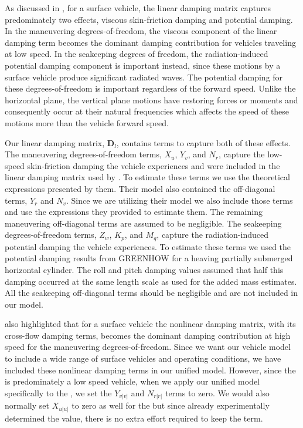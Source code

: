 \documentclass[utf8]{frontiersSCNS} %
\begin{document}
\color{red} As discussed in \citet{fossen11handbook}, for a surface vehicle, the linear damping matrix captures predominately two effects, viscous skin-friction damping and potential damping. In the maneuvering degrees-of-freedom, the viscous component of the linear damping term becomes the dominant damping contribution for vehicles traveling at low speed. In the seakeeping degrees of freedom, the radiation-induced potential damping component is important instead, since these motions by a surface vehicle produce significant radiated waves. The potential damping for these degrees-of-freedom is important regardless of the forward speed. Unlike the horizontal plane, the vertical plane motions have restoring forces or moments and consequently occur at their natural frequencies which affects the speed of these motions more than the vehicle forward speed.

Our linear damping matrix, $\bm{D}_l$, contains terms to capture both of these effects. The maneuvering degrees-of-freedom terms, $X_{u}$, $Y_{v}$, and $N_{r}$, capture the low-speed skin-friction damping the vehicle experiences and were included in the linear damping matrix used by \citet{sarda16station}. To estimate these terms we use the theoretical expressions presented by them. Their model also contained the off-diagonal terms, $Y_{r}$ and $N_{v}$. Since we are utilizing their model we also include those terms and use the expressions they provided to estimate them. The remaining maneuvering off-diagonal terms are assumed to be negligible. The seakeeping degrees-of-freedom terms, $Z_{w}$, $K_{p}$, and $M_{q}$, capture the radiation-induced potential damping the vehicle experiences. To estimate these terms we used the potential damping results from GREENHOW \citet{greenhow} for a heaving partially submerged horizontal cylinder. The roll and pitch damping values assumed that half this damping occurred at the same length scale as used for the added mass estimates. All the seakeeping off-diagonal terms should be negligible and are not included in our model.

\citet{fossen11handbook} also highlighted that for a surface vehicle the nonlinear damping matrix, with its cross-flow damping terms, becomes the dominant damping contribution at high speed for the maneuvering degrees-of-freedom. Since we want our vehicle model to include a wide range of surface vehicles and operating conditions, we have included these nonlinear damping terms in our unified model. However, since the \wamv{} is predominately a low speed vehicle, when we apply our unified model specifically to the \wamv{}, we set the $Y_{v|v|}$ and $N_{r|r|}$ terms to zero. We would also normally set $X_{u|u|}$ to zero as well for the \wavm{} but since \citet{sarda16station} already experimentally determined the value, there is no extra effort required to keep the term.\color{black}
\end{document}
